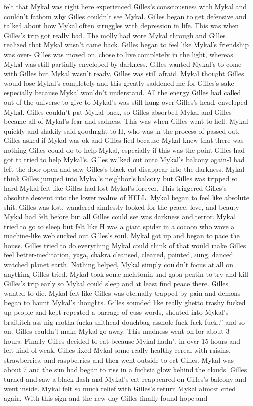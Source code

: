 \documentclass[12pt]{book}
\begin{document}
felt that Mykal was right here experienced Gilles's consciousness with Mykal and couldn't fathom why Gilles couldn't see Mykal. Gilles began to get defensive and talked about how Mykal often struggles with depression in life. This was when Gilles's trip got really bad. The molly had wore Mykal through and Gilles realized that Mykal wasn't came back. Gilles began to feel like Mykal's friendship was over- Gilles was moved on, chose to live completely in the light, whereas Mykal was still partially enveloped by darkness. Gilles wanted Mykal's to come with Gilles but Mykal wasn't ready, Gilles was still afraid. Mykal thought Gilles would lose Mykal's completely and this greatly saddened me-for Gilles's sake especially because Mykal wouldn't understand. All the energy Gilles had called out of the universe to give to Mykal's was still hung over Gilles's head, enveloped Mykal. Gilles couldn't put Mykal back, so Gilles absorbed Mykal and Gilles became all of Mykal's fear and sadness. This was when Gilles went to hell. Mykal quickly and shakily said goodnight to H, who was in the process of passed out. Gilles asked if Mykal was ok and Gilles lied because Mykal knew that there was nothing Gilles could do to help Mykal, especially if this was the point Gilles had got to tried to help Mykal's. Gilles walked out onto Mykal's balcony again-I had left the door open and saw Gilles's black cat disappear into the darkness. Mykal think Gilles jumped into Mykal's neighbor's balcony but Gilles was tripped so hard Mykal felt like Gilles had lost Mykal's forever. This triggered Gilles's absolute descent into the lower realms of HELL. Mykal began to feel like absolute shit. Gilles was lost, wandered aimlessly looked for the peace, love, and beauty Mykal had felt before but all Gilles could see was darkness and terror. Mykal tried to go to sleep but felt like H was a giant spider in a cocoon who wove a machine-like web sucked out Gilles's soul. Mykal got up and began to pace the house. Gilles tried to do everything Mykal could think of that would make Gilles feel better-meditation, yoga, chakra cleansed, cleaned, painted, sung, danced, watched planet earth. Nothing helped, Mykal simply couldn't focus at all on anything Gilles tried. Mykal took some melatonin and gaba pentin to try and kill Gilles's trip early so Mykal could sleep and at least find peace there. Gilles wanted to die. Mykal felt like Gilles was eternally trapped by pain and demons began to haunt Mykal's thoughts. Gilles sounded like really ghetto trashy fucked up people and kept repeated a barrage of cuss words, shouted into Mykal's braibitch ass nig motha fucka shithead douchbag asshole fuck fuck fuck..'' and so on. Gilles couldn't make Mykal go away. This madness went on for about 3 hours. Finally Gilles decided to eat because Mykal hadn't in over 15 hours and felt kind of weak. Gilles fixed Mykal some really healthy cereal with raisins, strawberries, and raspberries and then went outside to eat Gilles. Mykal was about 7 and the sun had began to rise in a fuchsia glow behind the clouds. Gilles turned and saw a black flash and Mykal's cat reappeared on Gilles's balcony and went inside. Mykal felt so much relief with Gilles's return Mykal almost cried again. With this sign and the new day Gilles finally found hope and 
\end{document}
